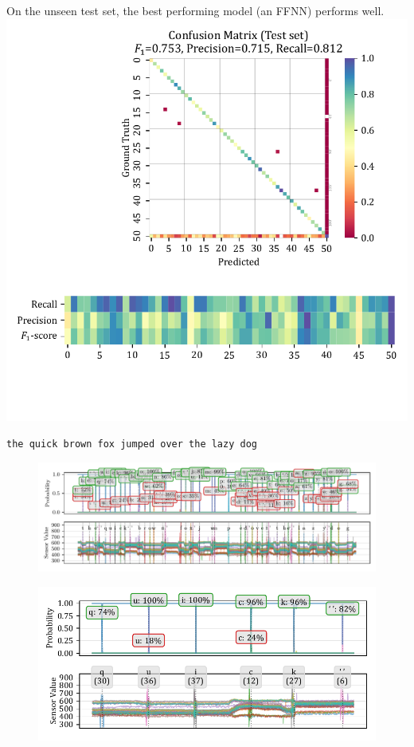 \documentclass[xcolor={svgnames,table},10pt,fleqn]{beamer}
\begin{document}
\begin{frame}
    On the unseen test set, the best performing model (an FFNN) performs well.
    \includegraphics[width=\textwidth]{05_tst_set_conf_mat.pdf}
\end{frame}

\begin{frame}
    \texttt{the quick brown fox jumped over the lazy dog}
    \begin{figure}[h]
        \centering
        \includegraphics[width=\textwidth]{05_pred_plot_0000_to_9420_full_text.pdf}
    \end{figure}
\end{frame}

\begin{frame}
    \begin{figure}[h]
        \centering
        \includegraphics[width=\textwidth]{05_pred_plot_0900_to_1800_quick.pdf}
    \end{figure}
\end{frame}
\end{document}
